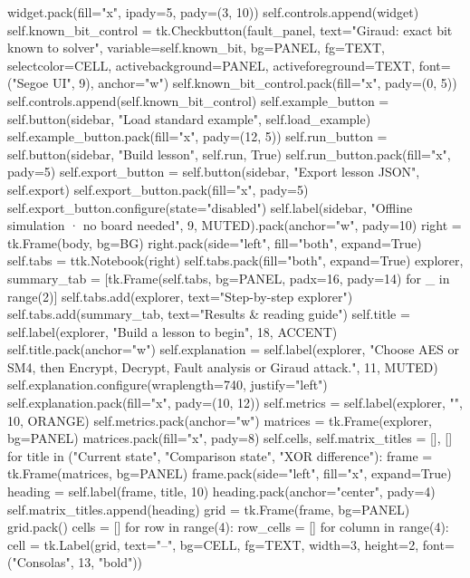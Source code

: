 \begin{lightcode}[numbers=left,firstnumber=1]
            widget.pack(fill="x", ipady=5, pady=(3, 10))
            self.controls.append(widget)
        self.known_bit_control = tk.Checkbutton(fault_panel, text="Giraud: exact bit known to solver", variable=self.known_bit, bg=PANEL, fg=TEXT, selectcolor=CELL, activebackground=PANEL, activeforeground=TEXT, font=("Segoe UI", 9), anchor="w")
        self.known_bit_control.pack(fill="x", pady=(0, 5))
        self.controls.append(self.known_bit_control)
        self.example_button = self.button(sidebar, "Load standard example", self.load_example)
        self.example_button.pack(fill="x", pady=(12, 5))
        self.run_button = self.button(sidebar, "Build lesson", self.run, True)
        self.run_button.pack(fill="x", pady=5)
        self.export_button = self.button(sidebar, "Export lesson JSON", self.export)
        self.export_button.pack(fill="x", pady=5)
        self.export_button.configure(state="disabled")
        self.label(sidebar, "Offline simulation · no board needed", 9, MUTED).pack(anchor="w", pady=10)
        right = tk.Frame(body, bg=BG)
        right.pack(side="left", fill="both", expand=True)
        self.tabs = ttk.Notebook(right)
        self.tabs.pack(fill="both", expand=True)
        explorer, summary_tab = [tk.Frame(self.tabs, bg=PANEL, padx=16, pady=14) for _ in range(2)]
        self.tabs.add(explorer, text="Step-by-step explorer")
        self.tabs.add(summary_tab, text="Results & reading guide")
        self.title = self.label(explorer, "Build a lesson to begin", 18, ACCENT)
        self.title.pack(anchor="w")
        self.explanation = self.label(explorer, "Choose AES or SM4, then Encrypt, Decrypt, Fault analysis or Giraud attack.", 11, MUTED)
        self.explanation.configure(wraplength=740, justify="left")
        self.explanation.pack(fill="x", pady=(10, 12))
        self.metrics = self.label(explorer, "", 10, ORANGE)
        self.metrics.pack(anchor="w")
        matrices = tk.Frame(explorer, bg=PANEL)
        matrices.pack(fill="x", pady=8)
        self.cells, self.matrix_titles = [], []
        for title in ("Current state", "Comparison state", "XOR difference"):
            frame = tk.Frame(matrices, bg=PANEL)
            frame.pack(side="left", fill="x", expand=True)
            heading = self.label(frame, title, 10)
            heading.pack(anchor="center", pady=4)
            self.matrix_titles.append(heading)
            grid = tk.Frame(frame, bg=PANEL)
            grid.pack()
            cells = []
            for row in range(4):
                row_cells = []
                for column in range(4):
                    cell = tk.Label(grid, text="--", bg=CELL, fg=TEXT, width=3, height=2, font=("Consolas", 13, "bold"))

\end{lightcode}
